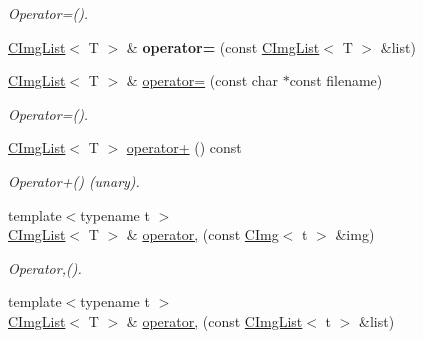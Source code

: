 \begin{DoxyCompactItemize}
\begin{DoxyCompactList}\small\item\em Operator=(). \item\end{DoxyCompactList}\item 
\hypertarget{structcimg__library_1_1CImgList_ad332c325150462debaea7322045762b0}{
\hyperlink{structcimg__library_1_1CImgList}{CImgList}$<$ T $>$ \& {\bfseries operator=} (const \hyperlink{structcimg__library_1_1CImgList}{CImgList}$<$ T $>$ \&list)}
\label{structcimg__library_1_1CImgList_ad332c325150462debaea7322045762b0}

\item 
\hypertarget{structcimg__library_1_1CImgList_a14ed1542e0e40a6b4c5061b95e8fe557}{
\hyperlink{structcimg__library_1_1CImgList}{CImgList}$<$ T $>$ \& \hyperlink{structcimg__library_1_1CImgList_a14ed1542e0e40a6b4c5061b95e8fe557}{operator=} (const char $\ast$const filename)}
\label{structcimg__library_1_1CImgList_a14ed1542e0e40a6b4c5061b95e8fe557}

\begin{DoxyCompactList}\small\item\em Operator=(). \item\end{DoxyCompactList}\item 
\hyperlink{structcimg__library_1_1CImgList}{CImgList}$<$ T $>$ \hyperlink{structcimg__library_1_1CImgList_a93d7eb669f13af8e6a4d05472f995470}{operator+} () const 
\begin{DoxyCompactList}\small\item\em Operator+() (unary). \item\end{DoxyCompactList}\item 
\hypertarget{structcimg__library_1_1CImgList_a9c9486e30ea8c17ac092aa32b8898417}{
{\footnotesize template$<$typename t $>$ }\\\hyperlink{structcimg__library_1_1CImgList}{CImgList}$<$ T $>$ \& \hyperlink{structcimg__library_1_1CImgList_a9c9486e30ea8c17ac092aa32b8898417}{operator,} (const \hyperlink{structcimg__library_1_1CImg}{CImg}$<$ t $>$ \&img)}
\label{structcimg__library_1_1CImgList_a9c9486e30ea8c17ac092aa32b8898417}

\begin{DoxyCompactList}\small\item\em Operator,(). \item\end{DoxyCompactList}\item 
\hypertarget{structcimg__library_1_1CImgList_ab548ea2c24938c20250f879c4be3757a}{
{\footnotesize template$<$typename t $>$ }\\\hyperlink{structcimg__library_1_1CImgList}{CImgList}$<$ T $>$ \& \hyperlink{structcimg__library_1_1CImgList_ab548ea2c24938c20250f879c4be3757a}{operator,} (const \hyperlink{structcimg__library_1_1CImgList}{CImgList}$<$ t $>$ \&list)}
\label{structcimg__library_1_1CImgList_ab548ea2c24938c20250f879c4be3757a}


\end{DoxyCompactItemize}
